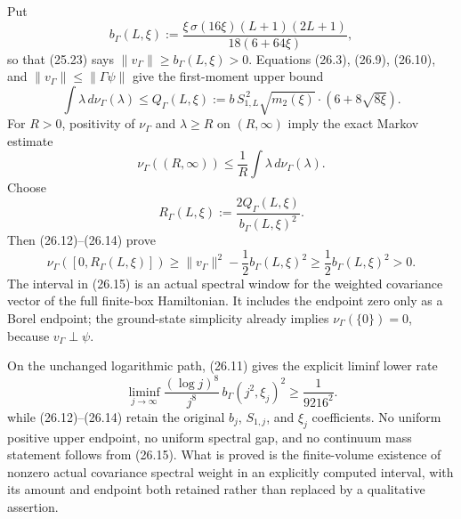 \documentclass[
]{article}
\begin{document}
Put \[
 b_{\Gamma}(L,\xi):=
 \frac{\xi\,\sigma(16\xi)(L+1)(2L+1)}
 {18(6+64\xi)} ,
 \tag{26.11}
\] so that (25.23) says \(\|v_\Gamma\|\ge b_\Gamma(L,\xi)>0\). Equations
(26.3), (26.9), (26.10), and \(\|v_\Gamma\|\le\|\Gamma\psi\|\) give the
first-moment upper bound \[
 \int\lambda\,d\nu_\Gamma(\lambda)
 \le Q_{\Gamma}(L,\xi):=
 b\,S_{1,L}^{\,2}\sqrt{m_2(\xi)}
 \cdot\left(6+8\sqrt{8\xi}\right).
 \tag{26.12}
\] For \(R>0\), positivity of \(\nu_\Gamma\) and \(\lambda\ge R\) on
\((R,\infty)\) imply the exact Markov estimate \[
 \nu_\Gamma((R,\infty))
 \le\frac1R\int\lambda\,d\nu_\Gamma(\lambda).
 \tag{26.13}
\] Choose \[
 R_{\Gamma}(L,\xi):=
 \frac{2Q_{\Gamma}(L,\xi)}{b_{\Gamma}(L,\xi)^2}.
 \tag{26.14}
\] Then (26.12)--(26.14) prove \[
 \boxed{\displaystyle
 \nu_\Gamma([0,R_{\Gamma}(L,\xi)])
 \ge \|v_\Gamma\|^2-\frac12b_\Gamma(L,\xi)^2
 \ge\frac12b_\Gamma(L,\xi)^2>0 .}
 \tag{26.15}
\] The interval in (26.15) is an actual spectral window for the weighted
covariance vector of the full finite-box Hamiltonian. It includes the
endpoint zero only as a Borel endpoint; the ground-state simplicity
already implies \(\nu_\Gamma(\{0\})=0\), because \(v_\Gamma\perp\psi\).

On the unchanged logarithmic path, (26.11) gives the explicit liminf
lower rate \[
 \liminf_{j\to\infty}
 \frac{(\log j)^8}{j^8}\,b_\Gamma(j^2,\xi_j)^2
 \ge\frac1{9216^2}.
 \tag{26.16}
\] while (26.12)--(26.14) retain the original \(b_j\), \(S_{1,j}\), and
\(\xi_j\) coefficients. No uniform positive upper endpoint, no uniform
spectral gap, and no continuum mass statement follows from (26.15). What
is proved is the finite-volume existence of nonzero actual covariance
spectral weight in an explicitly computed interval, with its amount and
endpoint both retained rather than replaced by a qualitative assertion.
\end{document}
